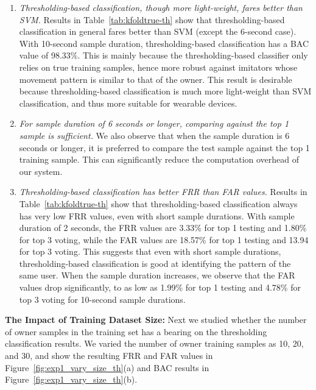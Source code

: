 \begin{enumerate}
\item \emph{Thresholding-based classification, though more light-weight, fares better than SVM.} Results in Table~\ref{tab:kfoldtrue-th} show that thresholding-based classification in general fares better than SVM (except the 6-second case). With 10-second sample duration, thresholding-based classification has a BAC value of 98.33\%. This is mainly because the thresholding-based classifier only relies on true training samples, hence more robust against imitators whose movement pattern is similar to that of the owner. This result is desirable because thresholding-based classification is much more light-weight than SVM classification, and thus more suitable for wearable devices.

\item \emph{For sample duration of 6 seconds or longer, comparing against the top 1 sample is sufficient.} We also observe that when the sample duration is 6 seconds or longer, it is preferred to compare the test sample against the top 1 training sample. This can significantly reduce the computation overhead of our system.

\item \emph{Thresholding-based classification has better FRR than FAR values.} Results in Table~\ref{tab:kfoldtrue-th} show that thresholding-based classification always has very low FRR values, even with short sample durations. With sample duration of 2 seconds, the FRR values are 3.33\% for top 1 testing and 1.80\% for top 3 voting, while the FAR values are 18.57\% for top 1 testing and 13.94 for top 3 voting. This suggests that even with short sample durations, thresholding-based classification is good at identifying the pattern of the same user. When the sample duration increases, we observe that the FAR values drop significantly, to as low as 1.99\% for top 1 testing and 4.78\% for top 3 voting for 10-second sample durations.
\end{enumerate}

\vspace{4pt}\textbf{The Impact of Training Dataset Size:} Next we studied whether the number of owner samples in the training set has a bearing on the thresholding classification results. We varied the number of owner training samples as 10, 20, and 30, and show the resulting FRR and FAR values in Figure~\ref{fig:exp1_vary_size_th}(a) and BAC results in Figure~\ref{fig:exp1_vary_size_th}(b). %

